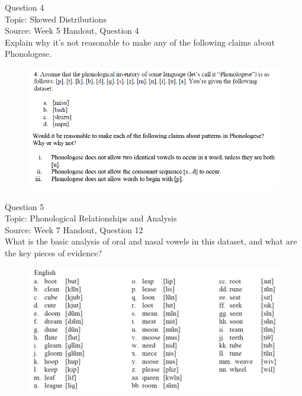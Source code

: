 \documentclass[12pt]{article}
\begin{document}
\newpage

{\large Question 4}\\

Topic: Skewed Distributions\\
Source: Week 5 Handout, Question 4\\

Explain why it's not reasonable to make any of the following claims about Phonologese.\\

\begin{figure}[H]
\includegraphics{../images/Phonologese.png}
\end{figure}

\newpage

{\large Question 5}\\

Topic: Phonological Relationships and Analysis\\
Source: Week 7 Handout, Question 12\\

What is the basic analysis of oral and nasal vowels in this dataset, and what are the key pieces of evidence?\\

\begin{figure}[H]
\includegraphics{../images/english12.png}
\end{figure}
\end{document}
